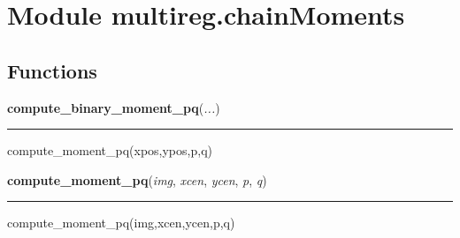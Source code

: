 %
%
%


\section{Module multireg.chainMoments}

    \label{multireg:chainMoments}


  \subsection{Functions}

    \label{multireg:chainMoments:compute_binary_moment_pq}
    \vspace{0.5ex}

    \begin{boxedminipage}{\textwidth}

    \raggedright \textbf{compute\_binary\_moment\_pq}(\textit{...})

    \vspace{-1.5ex}

    \rule{\textwidth}{0.5\fboxrule}
    compute\_moment\_pq(xpos,ypos,p,q)

    \vspace{1ex}

    \end{boxedminipage}

    \label{multireg:chainMoments:compute_moment_pq}
    \vspace{0.5ex}

    \begin{boxedminipage}{\textwidth}

    \raggedright \textbf{compute\_moment\_pq}(\textit{img}, \textit{xcen}, \textit{ycen}, \textit{p}, \textit{q})

    \vspace{-1.5ex}

    \rule{\textwidth}{0.5\fboxrule}
    compute\_moment\_pq(img,xcen,ycen,p,q)

    \vspace{1ex}

    \end{boxedminipage}

